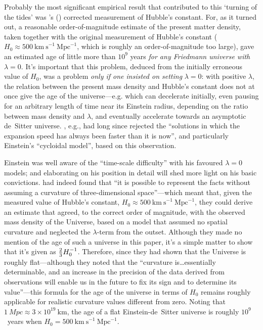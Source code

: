 \documentclass[12 pt]{article}
\def\citeapos#1{\citeauthor{#1}'s (\citeyear{#1})}
\begin{document}
Probably the most significant empirical result that contributed to this `turning of the tides' was \citeapos{Sandage1958} corrected measurement of Hubble's constant. For, as it turned out, a reasonable order-of-magnitude estimate of the present matter density, taken together with the original measurement of Hubble's constant ($H_0\approx500~\mathrm{km~s}^{-1}~\mathrm{Mpc}^{-1}$, which is roughly an order-of-magnitude too large), gave an estimated age of little more than $10^9$ years \textit{for any Friedmann universe with} $\lambda=0$. It's important that this problem, deduced from the initially erroneous value of $H_0$, was a problem \textit{only if one insisted on setting} $\lambda=0$: with positive $\lambda$, the relation between the present mass density and Hubble's constant does not at once give the age of the universe---e.g. which can decelerate initially, even pausing for an arbitrary length of time near its Einstein radius, depending on the ratio between mass density and $\lambda$, and eventually accelerate towards an asymptotic de~Sitter universe. \citet{Lemaitre1933}, e.g., had long since rejected the ``solutions in which the expansion speed has always been faster than it is now'', and particularly Einstein's ``cycloidal model'', based on this observation. 

Einstein was well aware of the ``time-scale difficulty'' with his favoured $\lambda=0$ models; and elaborating on his position in detail will shed more light on his basic convictions. \citet{Einstein1932} had indeed found that ``it is possible to represent the facts without assuming a curvature of three-dimensional space''---which meant that, given the measured value of Hubble's constant, $H_0\approx500~\mathrm{km~s}^{-1}~\mathrm{Mpc}^{-1}$, they could derive an estimate that agreed, to the correct order of magnitude, with the observed mass density of the Universe, based on a model that assumed no spatial curvature and neglected the $\lambda$-term from the outset. Although they made no mention of the age of such a universe in this paper, it's a simple matter to show that it's given as ${2 \over 3}H_0^{-1}$. Therefore, since they had shown that the Universe is roughly flat---although they noted that the ``curvature is\ldots essentially determinable, and an increase in the precision of the data derived from observations will enable us in the future to fix its sign and to determine its value''---this formula for the age of the universe in terms of $H_0$ remains roughly applicable for realistic curvature values different from zero. Noting that $1~Mpc\approx3\times10^19~\mathrm{km}$, the age of a flat Einstein-de~Sitter universe is roughly $10^9$~years when $H_0=500~\mathrm{km~s}^{-1}~\mathrm{Mpc}^{-1}$.
\end{document}
